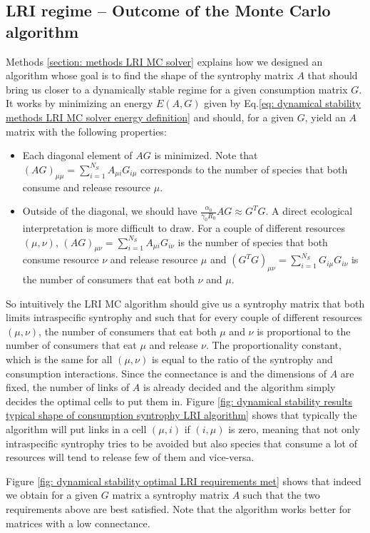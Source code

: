 \documentclass[12pt, titlepage]{report}
\begin{document}
\subsection{LRI regime -- Outcome of the Monte Carlo algorithm}
Methods \ref{section: methods LRI MC solver} explains how we designed an algorithm whose goal is to find the shape of the syntrophy matrix $A$ that should bring us closer to a dynamically stable regime for a given consumption matrix $G$. It works by minimizing an energy $E(A,G)$ given by Eq.\eqref{eq: dynamical stability methods LRI MC solver energy definition} and should, for a given $G$, yield an $A$ matrix with the following properties:
\begin{itemize}
\item Each diagonal element of $AG$ is minimized. Note that $(AG)_{\mu\mu}=\sum_{i=1}^{N_S} A_{\mu i} G_{i\mu}$ corresponds to the number of species that both consume and release resource $\mu$.
\item Outside of the diagonal, we should have $\frac{\alpha_0}{\gamma_0 R_0} AG \approx  G^T G$. A direct ecological interpretation is more difficult to draw. For a couple of different resources $(\mu,\nu)$,  $(AG)_{\mu\nu}=\sum_{i=1}^{N_S} A_{\mu i} G_{i\nu}$ is the number of species that both consume resource $\nu$ and release resource $\mu$ and $(G^TG)_{\mu\nu}=\sum_{i=1}^{N_S} G_{i\mu}G_{i\nu}$ is the number of consumers that eat both $\nu$ and $\mu$.
\end{itemize}
So intuitively the LRI MC algorithm should give us a syntrophy matrix that both limits intraspecific syntrophy and such that for every couple of different resources $(\mu, \nu)$, the number of consumers that eat both $\mu$ and $\nu$ is proportional to the number of consumers that eat $\mu$ and release $\nu$. The proportionality constant, which is the same for all $(\mu, \nu)$ is equal to the ratio of the syntrophy and consumption interactions.
 Since the connectance is and the dimensions of $A$ are fixed, the number of links of $A$ is already decided and the algorithm simply decides the optimal cells to put them in. Figure \ref{fig: dynamical stability results typical shape of consumption syntrophy LRI algorithm} shows that typically the algorithm will put links in a cell $(\mu,i)$ if $(i, \mu)$ is zero, meaning that not only intraspecific syntrophy tries to be avoided but also species that consume a lot of resources will tend to release few of them and vice-versa.

Figure \ref{fig: dynamical stability optimal LRI requirements met} shows that indeed we obtain for a given $G$ matrix a syntrophy matrix $A$ such that the two requirements above are best satisfied. Note that the algorithm works better for matrices with a low connectance.
\end{document}
